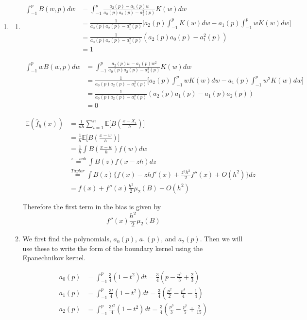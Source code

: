 \documentclass[12pt]{article}  %
\newcommand{\E}{{\mathbb{E}}}
\begin{document}
\begin{enumerate}
\item 
\begin{enumerate}
\item 
\begin{align*}
\int_{-1}^{p}B(w,p)dw &= \int_{-1}^{p}\frac{a_2(p)-a_1(p)w}{a_0(p)a_2(p)-a_1^2(p)}K(w)dw\\
&= \frac{1}{a_0(p)a_2(p) - a_1^2(p)}\bigg[a_2(p)\int_{-1}^{p}K(w)dw - a_1(p)\int_{-1}^{p} wK(w)dw\bigg]\\
&=  \frac{1}{a_0(p)a_2(p) - a_1^2(p)}\left(a_2(p)a_0(p) - a_1^2(p)\right)\\
&= 1
\end{align*}

\begin{align*}
\int_{-1}^{p}wB(w,p)dw &= \int_{-1}^{p}\frac{a_2(p)w-a_1(p)w^2}{a_0(p)a_2(p)-a_1^2(p)}K(w)dw\\
&= \frac{1}{a_0(p)a_2(p) - a_1^2(p)}\bigg[a_2(p)\int_{-1}^{p}wK(w)dw - a_1(p)\int_{-1}^{p} w^2K(w)dw\bigg]\\
&=  \frac{1}{a_0(p)a_2(p) - a_1^2(p)}\left(a_2(p)a_1(p) - a_1(p)a_2(p)\right)\\
&= 0
\end{align*}

\begin{align*}
\E(\hat{f}_h(x)) &= \frac{1}{nh}\sum_{i=1}^{n}\E\Big[B\left(\frac{x-X_i}{h}\right)\Big]\\
&= \frac{1}{h}\E\Big[B\left(\frac{x-w}{h}\right)\Big]\\
&= \frac{1}{h}\int B\left(\frac{x-w}{h}\right)f(w)dw\\
&\overset{z-sub}{=}\int B(z)f(x-zh)dz\\
&\overset{Taylor}{=}\int B(z)\Big\{f(x) - zhf'(x) + \frac{z^2h^2}{2}f''(x) +O(h^2)\Big\}dz\\
&= f(x) + f''(x)\frac{h^2}{2}\mu_2(B) + O(h^2)
\end{align*}

Therefore the first term in the bias is given by $$f''(x)\frac{h^2}{2}\mu_2(B)$$
\item We first find the polynomials, $a_0(p)$, $a_1(p)$, and $a_2(p)$. Then we will use these to write the form of the boundary kernel using the Epanechnikov kernel. 

\begin{align*}
a_0(p) &= \int_{-1}^{p}\frac{3}{4}(1-t^2)dt = \frac{3}{4}\left(p-\frac{p^3}{3} +\frac{2}{3}\right)\\
a_1(p) &= \int_{-1}^{p}\frac{3t}{4}(1-t^2)dt = \frac{3}{4}\left(\frac{p^2}{2}-\frac{p^4}{4} -\frac{1}{4}\right)\\
a_2(p) &= \int_{-1}^{p}\frac{3t^2}{4}(1-t^2)dt = \frac{3}{4}\left(\frac{p^3}{3}-\frac{p^5}{5} +\frac{2}{15}\right)\\
\end{align*}


\end{enumerate}
\end{enumerate}
\end{document}
